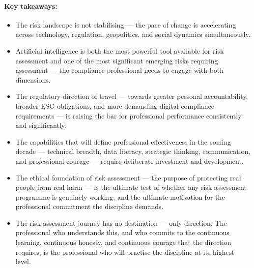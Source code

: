 \paragraph{Key takeaways:}
\begin{itemize}
  \item{The risk landscape is not stabilising — the pace of change is accelerating across technology, regulation, geopolitics, and social dynamics simultaneously.}
  \item{Artificial intelligence is both the most powerful tool available for risk assessment and one of the most significant emerging risks requiring assessment — the compliance professional needs to engage with both dimensions.}
  \item{The regulatory direction of travel — towards greater personal accountability, broader ESG obligations, and more demanding digital compliance requirements — is raising the bar for professional performance consistently and significantly.}
  \item{The capabilities that will define professional effectiveness in the coming decade — technical breadth, data literacy, strategic thinking, communication, and professional courage — require deliberate investment and development.}
  \item{The ethical foundation of risk assessment — the purpose of protecting real people from real harm — is the ultimate test of whether any risk assessment programme is genuinely working, and the ultimate motivation for the professional commitment the discipline demands.}
  \item{The risk assessment journey has no destination — only direction. The professional who understands this, and who commits to the continuous learning, continuous honesty, and continuous courage that the direction requires, is the professional who will practise the discipline at its highest level.}
\end{itemize}


